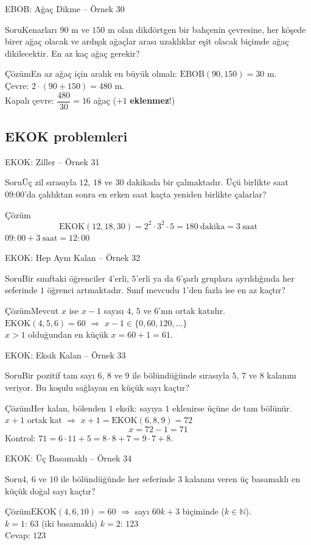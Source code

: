 \documentclass[aspectratio=169,11pt,handout]{beamer}
\newcommand{\soru}[3]{%
\begin{frame}{#1}
  \begin{block}{Soru}\large #2\end{block}
  \pause
  \begin{exampleblock}{Çözüm}\large #3\end{exampleblock}
\end{frame}}
\begin{document}
\soru{EBOB: Ağaç Dikme -- Örnek 30}
{Kenarları \(90\) m ve \(150\) m olan dikdörtgen bir bahçenin çevresine, her köşede birer ağaç olacak ve ardışık ağaçlar arası uzaklıklar eşit olacak biçimde ağaç dikilecektir. En az kaç ağaç gerekir?}
{En az ağaç için aralık en büyük olmalı: \(\text{EBOB}(90,150)=30\) m.\\[3pt]
Çevre: \(2\cdot(90+150)=480\) m.\\[3pt]
Kapalı çevre: \(\dfrac{480}{30}=16\) ağaç \quad (\(+1\) \textbf{eklenmez}!)}

\subsection{EKOK problemleri}
\soru{EKOK: Ziller -- Örnek 31}
{Üç zil sırasıyla \(12\), \(18\) ve \(30\) dakikada bir çalmaktadır. Üçü birlikte saat 09{:}00'da çaldıktan sonra en erken saat kaçta yeniden birlikte çalarlar?}
{\[\text{EKOK}(12,18,30)=2^2\cdot 3^2\cdot 5=180\ \text{dakika}=3\ \text{saat}\]
\(09{:}00+3\ \text{saat}=12{:}00\)}

\soru{EKOK: Hep Aynı Kalan -- Örnek 32}
{Bir sınıftaki öğrenciler \(4\)'erli, \(5\)'erli ya da \(6\)'şarlı gruplara ayrıldığında her seferinde \(1\) öğrenci artmaktadır. Sınıf mevcudu \(1\)'den fazla ise en az kaçtır?}
{Mevcut \(x\) ise \(x-1\) sayısı \(4\), \(5\) ve \(6\)'nın ortak katıdır.\\[3pt]
\(\text{EKOK}(4,5,6)=60\) \(\Rightarrow\) \(x-1\in\{0,60,120,\dots\}\)\\[3pt]
\(x>1\) olduğundan en küçük \(x=60+1=61\).}

\soru{EKOK: Eksik Kalan -- Örnek 33}
{Bir pozitif tam sayı \(6\), \(8\) ve \(9\) ile bölündüğünde sırasıyla \(5\), \(7\) ve \(8\) kalanını veriyor. Bu koşulu sağlayan en küçük sayı kaçtır?}
{Her kalan, bölenden \(1\) eksik: sayıya \(1\) eklenirse üçüne de tam bölünür.\\[3pt]
\(x+1\) ortak kat \(\Rightarrow\) \(x+1=\text{EKOK}(6,8,9)=72\)
\[x=72-1=71\]
Kontrol: \(71=6\cdot 11+5=8\cdot 8+7=9\cdot 7+8\).}

\soru{EKOK: Üç Basamaklı -- Örnek 34}
{\(4\), \(6\) ve \(10\) ile bölündüğünde her seferinde \(3\) kalanını veren üç basamaklı en küçük doğal sayı kaçtır?}
{\(\text{EKOK}(4,6,10)=60\) \(\Rightarrow\) sayı \(60k+3\) biçiminde (\(k\in\mathbb{N}\)).\\[3pt]
\(k=1\): \(63\) (iki basamaklı) \quad \(k=2\): \(123\)\\[3pt]
Cevap: \(123\)}
\end{document}
